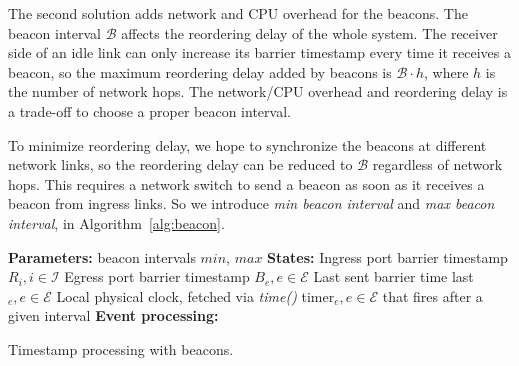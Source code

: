 The second solution adds network and CPU overhead for the beacons. The beacon interval $\mathcal{B}$ affects the reordering delay of the whole system. The receiver side of an idle link can only increase its barrier timestamp every time it receives a beacon, so the maximum reordering delay added by beacons is $\mathcal{B} \cdot h$, where $h$ is the number of network hops. The network/CPU overhead and reordering delay is a trade-off to choose a proper beacon interval.

To minimize reordering delay, we hope to synchronize the beacons at different network links, so the reordering delay can be reduced to $\mathcal{B}$ regardless of network hops. This requires a network switch to send a beacon as soon as it receives a beacon from ingress links. So we introduce \textit{min beacon interval} and \textit{max beacon interval}, in Algorithm~\ref{alg:beacon}.

\setlength{\textfloatsep}{1em}
\begin{algorithm}[t]
 \DontPrintSemicolon
 \textbf{Parameters:} beacon intervals $min$, $max$\;
 \textbf{States:} Ingress port barrier timestamp $R_i, i \in \mathcal{I}$\;
   \qquad Egress port barrier timestamp $B_e, e \in \mathcal{E}$\;
   \qquad Last sent barrier time last$_e, e \in \mathcal{E}$\;
   \qquad Local physical clock, fetched via \textit{time()}\;
   \qquad timer$_e, e \in \mathcal{E}$ that fires after a given interval\;
 \textbf{Event processing:}\\
 \caption{Timestamp processing with beacons.}
 \label{alg:beacon}
\end{algorithm}

